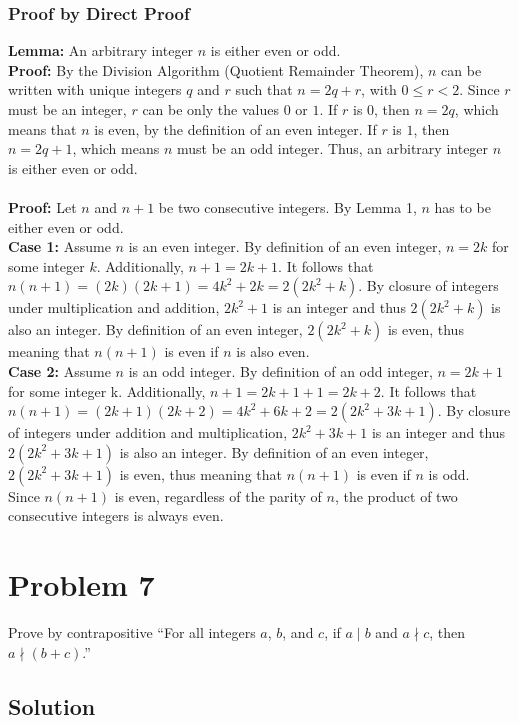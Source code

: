 \documentclass[table]{article}
\begin{document}
\subsubsection{Proof by Direct Proof}
\textbf{Lemma:} An arbitrary integer $n$ is either even or odd.\\
\textbf{Proof:} By the Division Algorithm (Quotient Remainder Theorem), $n$ can be written with unique integers $q$ and $r$ such that $n = 2q + r$, with $0 \leq r < 2$. Since $r$ must be an integer, $r$ can be only the values $0$ or $1$. If $r$ is 0, then $n=2q$, which means that $n$ is even, by the definition of an even integer. If $r$ is $1$, then $n=2q+1$, which means $n$ must be an odd integer. Thus, an arbitrary integer $n$ is either even or odd.\\~\\
\textbf{Proof:} Let $n$ and $n+1$ be two consecutive integers. By Lemma 1, $n$ has to be either even or odd.\\
\textbf{Case 1:} Assume $n$ is an even integer. By definition of an even integer, $n = 2k$ for some integer $k$. Additionally, $n+1=2k+1$. It follows that $n(n+1)=(2k)(2k+1)=4k^2+2k=2(2k^2+k)$. By closure of integers under multiplication and addition, $2k^2+1$ is an integer and thus $2(2k^2+k)$ is also an integer. By definition of an even integer, $2(2k^2+k)$ is even, thus meaning that $n(n+1)$ is even if $n$ is also even.\\
\textbf{Case 2:} Assume $n$ is an odd integer. By definition of an odd integer, $n = 2k+1$ for some integer k. Additionally, $n+1=2k+1+1=2k+2$. It follows that $n(n+1)=(2k+1)(2k+2)=4k^2+6k+2=2(2k^2+3k+1)$. By closure of integers under addition and multiplication, $2k^2+3k+1$ is an integer and thus $2(2k^2+3k+1)$ is also an integer. By definition of an even integer, $2(2k^2+3k+1)$ is even, thus meaning that $n(n+1)$ is even if $n$ is odd.\\
Since $n(n+1)$ is even, regardless of the parity of $n$, the product of two consecutive integers is always even.
\section{Problem 7}
Prove by contrapositive ``For all integers $a$, $b$, and $c$, if $a \mid b$ and $a \nmid c$, then $a \nmid (b + c)$.''
\large
\subsection{Solution}
\end{document}
